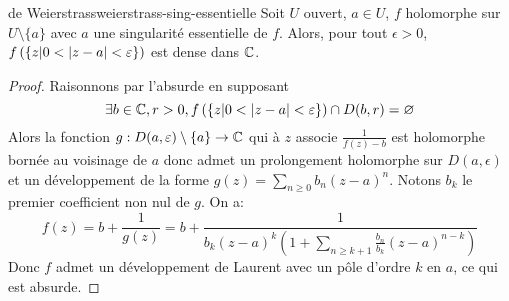 \documentclass{cours}
\begin{document}
\begin{théorème}
	{de Weierstrass}{weierstrass-sing-essentielle}
	Soit $U$ ouvert, $a \in U$, $f$ holomorphe sur $U \setminus \{a\}$ avec $a$ une singularité essentielle de $f$. 
	Alors, pour tout $\epsilon > 0$, $f\left(\left\{z \middle| 0 < \left|z - a\right| < \varepsilon\right\}\right)$ est dense dans $\mathbb{C}$. 
\end{théorème}
\begin{proof}
	Raisonnons par l'absurde en supposant 
	\begin{equation*}
		\exists b \in \mathbb{C}, r > 0, f\left(\left\{z \middle| 0 < \left|z - a\right| < \varepsilon\right\}\right) \cap D(b, r) = \varnothing
	\end{equation*}
	Alors la fonction $g : D(a, \varepsilon) \setminus \{a\} \to \mathbb{C}$ qui à $z$ associe $\frac{1}{f(z) - b}$ est holomorphe bornée au voisinage de $a$ donc admet un prolongement holomorphe sur $D(a, \epsilon)$ et un développement de la forme $g(z) = \sum_{n \geq 0} b_{n} \left(z - a\right)^{n}$. 
	Notons $b_{k}$ le premier coefficient non nul de $g$. On a: 
	\begin{equation*}
		f(z) = b + \frac{1}{g(z)} = b + \frac{1}{b_{k}(z - a)^{k}\left(1 + \sum_{n \geq k + 1} \frac{b_{n}}{b_{k}}(z - a)^{n-k}\right)}
	\end{equation*}
	Donc $f$ admet un développement de Laurent avec un pôle d'ordre $k$ en $a$, ce qui est absurde.
\end{proof}
\end{document}
